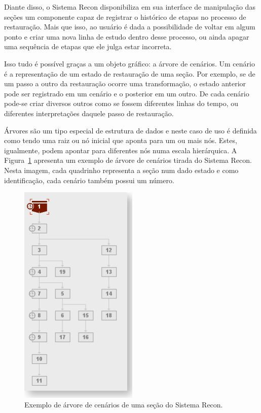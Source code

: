 Diante disso, o Sistema Recon disponibiliza em sua interface de manipulação das seções um componente capaz de registrar o histórico de etapas no processo de restauração. Mais que isso, ao usuário é dada a possibilidade de voltar em algum ponto e criar uma nova linha de estudo dentro desse processo, ou ainda apagar uma sequência de etapas que ele julga estar incorreta.

Isso tudo é possível graças a um objeto gráfico: a árvore de cenários. Um cenário é a representação de um estado de restauração de uma seção. Por exemplo, se de um passo a outro da restauração ocorre uma transformação, o estado anterior pode ser registrado em um cenário e o posterior em um outro. De cada cenário pode-se criar diversos outros como se fossem diferentes linhas do tempo, ou diferentes interpretações daquele passo de restauração.

Árvores são um tipo especial de estrutura de dados e neste caso de uso é definida como tendo uma raiz ou nó inicial que aponta para um ou mais nós. Estes, igualmente, podem apontar para diferentes nós numa escala hierárquica. A Figura~\ref{fig-recon-6} apresenta um exemplo de árvore de cenários tirada do Sistema Recon. Nesta imagem, cada quadrinho representa a seção num dado estado e como identificação, cada cenário também possui um número.

\begin{figure} [H]
  \begin{center}
    \includegraphics[width=160pt]{images/fig-recon-6}
    \caption{Exemplo de árvore de cenários de uma seção do Sistema Recon.}\label{fig-recon-6}
  \end{center}
\end{figure}

